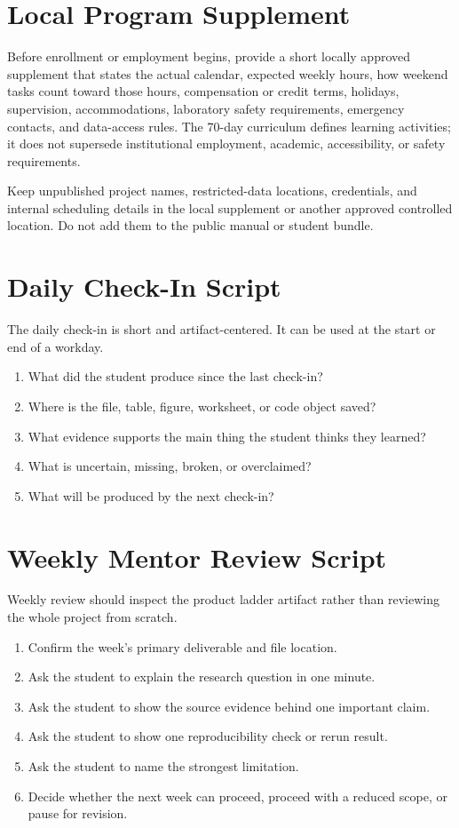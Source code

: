 \section{Local Program Supplement}
Before enrollment or employment begins, provide a short locally approved
supplement that states the actual calendar, expected weekly hours, how weekend
tasks count toward those hours, compensation or credit terms, holidays,
supervision, accommodations, laboratory safety requirements, emergency
contacts, and data-access rules. The 70-day curriculum defines learning
activities; it does not supersede institutional employment, academic,
accessibility, or safety requirements.

Keep unpublished project names, restricted-data locations, credentials, and
internal scheduling details in the local supplement or another approved
controlled location. Do not add them to the public manual or student bundle.

\section{Daily Check-In Script}
The daily check-in is short and artifact-centered. It can be used at the start or end of a workday.

\begin{enumerate}
  \item What did the student produce since the last check-in?
  \item Where is the file, table, figure, worksheet, or code object saved?
  \item What evidence supports the main thing the student thinks they learned?
  \item What is uncertain, missing, broken, or overclaimed?
  \item What will be produced by the next check-in?
\end{enumerate}

\section{Weekly Mentor Review Script}
Weekly review should inspect the product ladder artifact rather than reviewing the whole project from scratch.

\begin{enumerate}
  \item Confirm the week's primary deliverable and file location.
  \item Ask the student to explain the research question in one minute.
  \item Ask the student to show the source evidence behind one important claim.
  \item Ask the student to show one reproducibility check or rerun result.
  \item Ask the student to name the strongest limitation.
  \item Decide whether the next week can proceed, proceed with a reduced scope, or pause for revision.
\end{enumerate}

